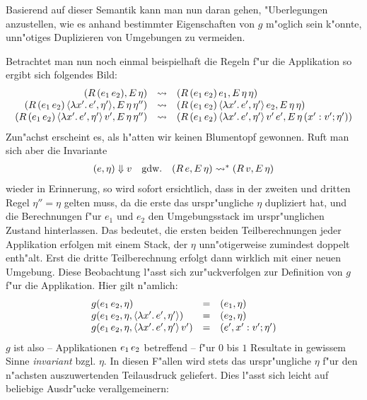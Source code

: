 \documentclass[12pt,a4paper,draft]{article}
\begin{document}
Basierend auf dieser Semantik kann man nun daran gehen, "Uberlegungen anzustellen, wie es anhand 
bestimmter Eigenschaften von $g$ m"oglich sein k"onnte, unn"otiges Duplizieren von Umgebungen zu
vermeiden.

Betrachtet man nun noch einmal beispielhaft die Regeln f"ur die Applikation so ergibt sich folgendes
Bild:
\[\begin{array}{rcl}
  (R\,({e_1}\,{e_2}),E\,\eta)
  &\rightsquigarrow& (R\,({e_1}\,{e_2})\,e_1,E\,\eta\,\eta) \\
  (R\,({e_1}\,{e_2})\,\langle{\lambda{x'}.\,{e'}},{\eta'}\rangle,E\,\eta\,\eta'')
  &\rightsquigarrow& (R\,({e_1}\,{e_2})\,\langle{\lambda{x'}.\,{e'}},{\eta'}\rangle\,e_2,E\,\eta\,\eta) \\
  (R\,({e_1}\,{e_2})\,\langle{\lambda{x'}.\,{e'}},{\eta'}\rangle\,v',E\,\eta\,\eta'')
  &\rightsquigarrow& (R\,({e_1}\,{e_2})\,\langle{\lambda{x'}.\,{e'}},{\eta'}\rangle\,v'\,e',E\,\eta\,(x':v';\eta')) \\
\end{array}\]
Zun"achst erscheint es, als h"atten wir keinen Blumentopf gewonnen. Ruft man sich aber die Invariante
\[\begin{array}{rcl}
  (e,\eta) \Downarrow v & \text{gdw.} & (R\,e,E\,\eta) \rightsquigarrow^* (R\,v,E\,\eta)
\end{array}\]
wieder in Erinnerung, so wird sofort ersichtlich, dass in der zweiten und dritten Regel $\eta'' = \eta$
gelten muss, da die erste das urspr"ungliche $\eta$ dupliziert hat, und die Berechnungen f"ur $e_1$ und
$e_2$ den Umgebungsstack im urspr"unglichen Zustand hinterlassen. Das bedeutet, die ersten beiden
Teilberechnungen jeder Applikation erfolgen mit einem Stack, der $\eta$ unn"otigerweise zumindest
doppelt enth"alt. Erst die dritte Teilberechnung erfolgt dann wirklich mit einer neuen Umgebung.
Diese Beobachtung l"asst sich zur"uckverfolgen zur Definition von $g$ f"ur die Applikation. Hier gilt
n"amlich:
\[\begin{array}{lcl}
  g({e_1}\,{e_2},\eta) &=& (e_1,\eta) \\
  g({e_1}\,{e_2},\eta,\langle{\lambda{x'}.\,{e'}},{\eta'}\rangle) &=& (e_2,\eta) \\
  g({e_1}\,{e_2},\eta,\langle{\lambda{x'}.\,{e'}},{\eta'}\rangle\,v') &=& (e',x':v';\eta') \\
\end{array}\]
$g$ ist also -- Applikationen ${e_1}\,{e_2}$ betreffend -- f"ur $0$ bis $1$ Resultate in gewissem Sinne
\emph{invariant} bzgl. $\eta$. In diesen F"allen wird stets das urspr"ungliche $\eta$ f"ur den n"achsten
auszuwertenden Teilausdruck geliefert. Dies l"asst sich leicht auf beliebige Ausdr"ucke verallgemeinern:
\end{document}
